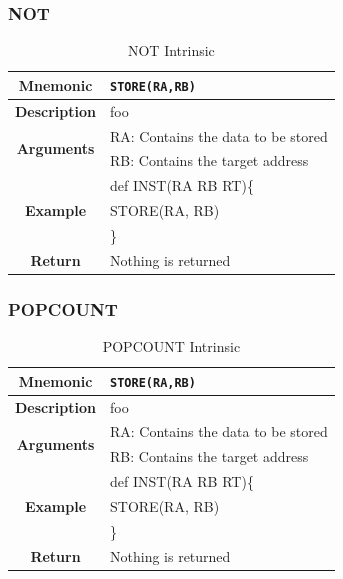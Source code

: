 \documentclass{article}
\begin{document}
\clearpage
\subsubsection{NOT}
\label{sec:NOT}

\begin{table}[h]
\begin{center}
\caption{NOT Intrinsic}
\vspace{0.125in}
\label{tab:NOTIntrinsic}
\begin{tabular}{|c|l|}
\hline
\textbf{Mnemonic} & \texttt{STORE(RA,RB)}\\
\hline
\textbf{Description} & foo\\
\hline
\multirow{2}{*}{\textbf{Arguments}} & RA: Contains the data to be stored\\
                          			     & RB: Contains the target address \\
\hline
\multirow{3}{*}{\textbf{Example}} & def INST(RA RB RT)\{\\
                          			  &   STORE(RA, RB)\\
                                                    & \}\\
\hline
\textbf{Return} & Nothing is returned\\                                                    
\hline
\end{tabular}
\end{center}
\end{table}

\clearpage
\subsubsection{POPCOUNT}
\label{sec:POPCOUNT}

\begin{table}[h]
\begin{center}
\caption{POPCOUNT Intrinsic}
\vspace{0.125in}
\label{tab:POPCOUNTIntrinsic}
\begin{tabular}{|c|l|}
\hline
\textbf{Mnemonic} & \texttt{STORE(RA,RB)}\\
\hline
\textbf{Description} & foo\\
\hline
\multirow{2}{*}{\textbf{Arguments}} & RA: Contains the data to be stored\\
                          			     & RB: Contains the target address \\
\hline
\multirow{3}{*}{\textbf{Example}} & def INST(RA RB RT)\{\\
                          			  &   STORE(RA, RB)\\
                                                    & \}\\
\hline
\textbf{Return} & Nothing is returned\\                                                    
\hline
\end{tabular}
\end{center}
\end{table}
\end{document}
